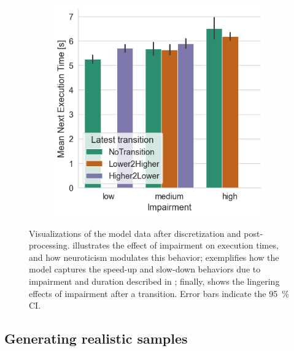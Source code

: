 \begin{figure}
\begin{subfigure}[t]{.28\textwidth}
        \caption{}\label{fig:timing:durvsetime}
    \end{subfigure}%
    \hspace{.05\textwidth}%
    \begin{subfigure}[t]{.28\textwidth}
        \centering
        \includegraphics[width=\textwidth]{./model_data/impairment_transition_vs_exectime.png}
        \caption{}\label{fig:timing:imptransvsetime}
    \end{subfigure}
    \caption{%
        Visualizations of the model data after discretization and post-processing.
         illustrates the effect of impairment on execution times, and how neuroticism modulates this behavior;
         exemplifies how the model captures the speed-up and slow-down behaviors due to impairment and duration described in \textcite{olguinmunoz:impact2021};
        finally,  shows the lingering effects of impairment after a transition.
        Error bars indicate the \SI{95}{\percent} \ac{CI}.
    }\label{fig:timing}
\end{figure}

\subsection{Generating realistic samples}\label{ssec:model:frames}

